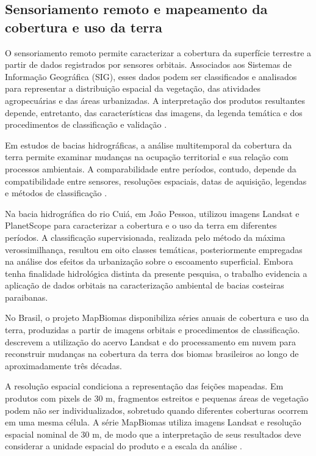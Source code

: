 \subsection{Sensoriamento remoto e mapeamento da cobertura e uso da terra}

O sensoriamento remoto permite caracterizar a cobertura da superfície terrestre a partir de dados registrados por sensores orbitais. Associados aos Sistemas de Informação Geográfica (SIG), esses dados podem ser classificados e analisados para representar a distribuição espacial da vegetação, das atividades agropecuárias e das áreas urbanizadas. A interpretação dos produtos resultantes depende, entretanto, das características das imagens, da legenda temática e dos procedimentos de classificação e validação \cite{foody2002,souza2020}.

Em estudos de bacias hidrográficas, a análise multitemporal da cobertura da terra permite examinar mudanças na ocupação territorial e sua relação com processos ambientais. A comparabilidade entre períodos, contudo, depende da compatibilidade entre sensores, resoluções espaciais, datas de aquisição, legendas e métodos de classificação \cite{foody2002,soares2024}.

Na bacia hidrográfica do rio Cuiá, em João Pessoa,  utilizou imagens Landsat e PlanetScope para caracterizar a cobertura e o uso da terra em diferentes períodos. A classificação supervisionada, realizada pelo método da máxima verossimilhança, resultou em oito classes temáticas, posteriormente empregadas na análise dos efeitos da urbanização sobre o escoamento superficial. Embora tenha finalidade hidrológica distinta da presente pesquisa, o trabalho evidencia a aplicação de dados orbitais na caracterização ambiental de bacias costeiras paraibanas.

No Brasil, o projeto MapBiomas disponibiliza séries anuais de cobertura e uso da terra, produzidas a partir de imagens orbitais e procedimentos de classificação.  descrevem a utilização do acervo Landsat e do processamento em nuvem para reconstruir mudanças na cobertura da terra dos biomas brasileiros ao longo de aproximadamente três décadas.

A resolução espacial condiciona a representação das feições mapeadas. Em produtos com pixels de 30 m, fragmentos estreitos e pequenas áreas de vegetação podem não ser individualizados, sobretudo quando diferentes coberturas ocorrem em uma mesma célula. A série MapBiomas utiliza imagens Landsat e resolução espacial nominal de 30 m, de modo que a interpretação de seus resultados deve considerar a unidade espacial do produto e a escala da análise \cite{souza2020,mapbiomas2026}.

